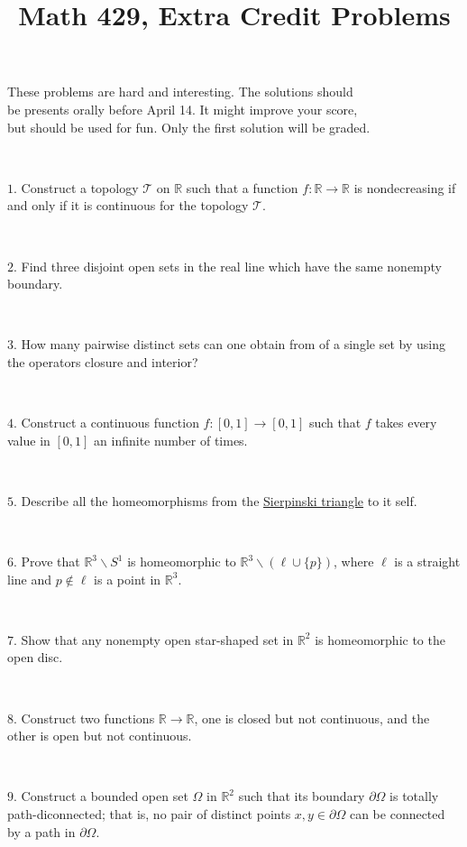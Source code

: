\documentclass{article}
\def\noi{\noindent}%
\def\RR{\mathbb{R}}%
\def\:{\colon}
\begin{document}
\title{Math 429, Extra Credit Problems}
\author{}
\date{}
\maketitle

\begin{center}
{\small These problems are hard and interesting. The solutions should \\
be presents orally before April 14. It might improve your score,\\
but should be used for fun. Only the first solution will be graded.}
\end{center}
\thispagestyle{empty}

\ 


\noi $1$. Construct a topology $\mathcal{T}$ on $\RR$ such that a function $f\:\RR\to\RR$ is nondecreasing if and only if it is continuous for the topology $\mathcal{T}$.

\ 


\noi $2$. 
Find three disjoint open sets in the real line 
which have the same nonempty boundary. 

\ 

\noi $3$. How many pairwise distinct sets can one obtain
from of a single set by using the operators closure and interior?

\ 

\noi $4$. Construct a continuous function 
$f\:[0,1]\rightarrow [0,1]$ such that $f$ takes every value in $[0,1]$ 
an infinite number of times.

\ 

\noi $5$. Describe all the homeomorphisms from the \href{http://en.wikipedia.org/wiki/Sierpinski_triangle}{Sierpinski triangle} to it self.

\ 

\noi $6$. Prove that $\RR^3\backslash S^1$ is homeomorphic to $\RR^3\backslash (\ell\cup \{p\})$, where $\ell$ is a straight line and $p\not\in\ell$ is a point in $\RR^3$.


\ 


\noi $7.$ Show that any nonempty open star-shaped set in $\RR^2$ is homeomorphic to the open disc.

\ 


\noi $8.$ Construct two functions $\RR\to\RR$, one is closed but not continuous, and the other is open but not continuous.

\ 

\noi $9.$
Construct a bounded open set $\Omega$ in $\RR^2$
such that its boundary $\partial \Omega$ is totally path-diconnected;
that is, no pair of distinct points $x,y\in\partial \Omega$ can be connected by a path in $\partial \Omega$.
\end{document}
